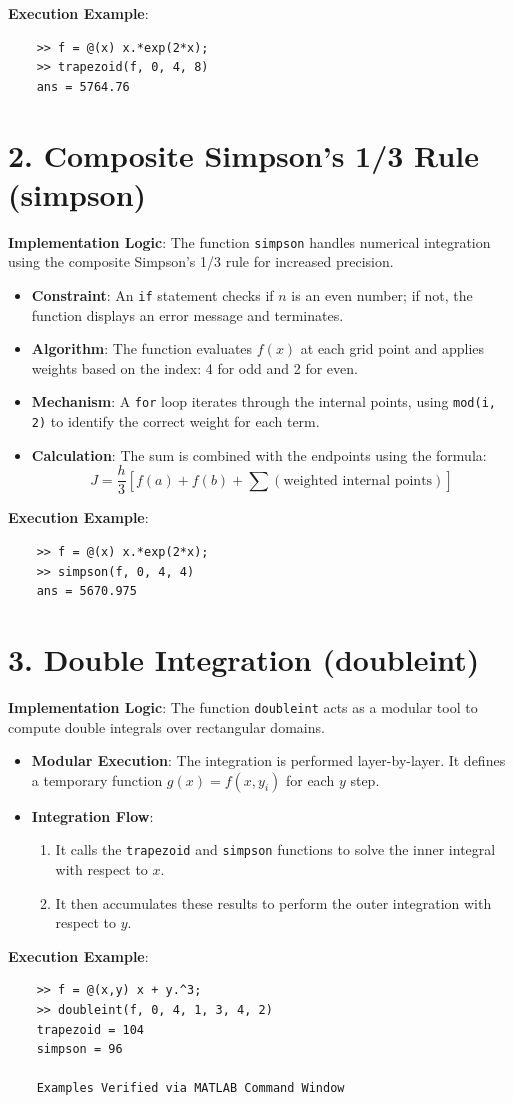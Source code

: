 \documentclass[12pt, a4paper]{article}
\begin{document}
\textbf{Execution Example}:
\begin{verbatim}
	>> f = @(x) x.*exp(2*x);
	>> trapezoid(f, 0, 4, 8)
	ans = 5764.76
\end{verbatim}

\section*{2. Composite Simpson's 1/3 Rule (simpson)}
\textbf{Implementation Logic}: The function \texttt{simpson} handles numerical integration using the composite Simpson's 1/3 rule for increased precision.

\begin{itemize}
	\item \textbf{Constraint}: An \texttt{if} statement checks if $n$ is an even number; if not, the function displays an error message and terminates.
	\item \textbf{Algorithm}: The function evaluates $f(x)$ at each grid point and applies weights based on the index: 4 for odd and 2 for even.
	\item \textbf{Mechanism}: A \texttt{for} loop iterates through the internal points, using \texttt{mod(i, 2)} to identify the correct weight for each term.
	\item \textbf{Calculation}: The sum is combined with the endpoints using the formula:
	\begin{equation*}
		J = \frac{h}{3} \left[ f(a) + f(b) + \sum (\text{weighted internal points}) \right]
	\end{equation*}
\end{itemize}

\textbf{Execution Example}:
\begin{verbatim}
	>> f = @(x) x.*exp(2*x);
	>> simpson(f, 0, 4, 4)
	ans = 5670.975
\end{verbatim}

\section*{3. Double Integration (doubleint)}
\textbf{Implementation Logic}: The function \texttt{doubleint} acts as a modular tool to compute double integrals over rectangular domains.

\begin{itemize}
	\item \textbf{Modular Execution}: The integration is performed layer-by-layer. It defines a temporary function $g(x) = f(x, y_i)$ for each $y$ step.
	\item \textbf{Integration Flow}: 
	\begin{enumerate}
		\item It calls the \texttt{trapezoid} and \texttt{simpson} functions to solve the inner integral with respect to $x$.
		\item It then accumulates these results to perform the outer integration with respect to $y$.
	\end{enumerate}
\end{itemize}

\textbf{Execution Example}:
\begin{verbatim}
	>> f = @(x,y) x + y.^3;
	>> doubleint(f, 0, 4, 1, 3, 4, 2)
	trapezoid = 104
	simpson = 96 
	
	Examples Verified via MATLAB Command Window
\end{verbatim}
\end{document}
